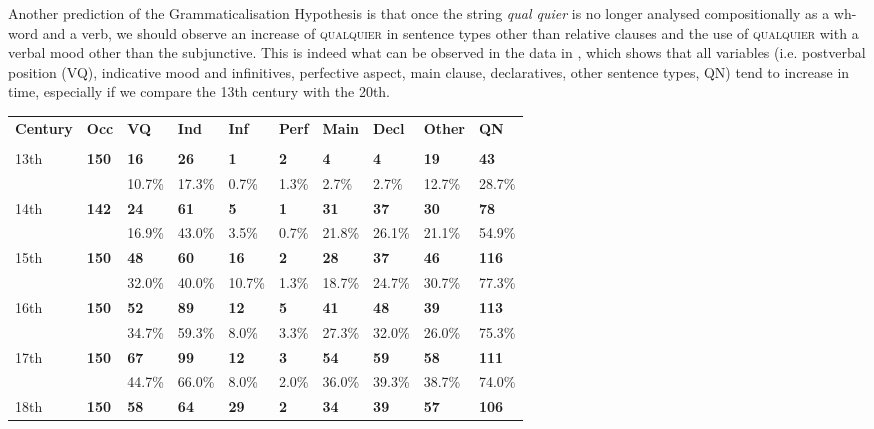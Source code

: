  Another prediction of the Grammaticalisation Hypothesis is that once the string \textit{qual quier} is no longer analysed compositionally as a wh-word and a verb, we should observe an increase of \textsc{qualquier} in sentence types other than relative clauses and the use of \textsc{qualquier} with a verbal mood other than the subjunctive. This is indeed what can be observed in the data in , which shows that all variables (i.e. postverbal position (VQ), indicative mood and infinitives, perfective aspect, main clause, declaratives, other sentence types, QN) tend to increase in time, especially if we compare the 13th century with the 20th.


\begin{table}
\begin{tabularx}{\textwidth}{XXXXXXXXXX}
\lsptoprule
 \textbf{Century} & \textbf{Occ} & \textbf{VQ} & \textbf{Ind} & \textbf{Inf} & \textbf{Perf} & \textbf{Main} & \textbf{Decl} & \textbf{Other} & \textbf{QN}\\
&  &  &  &  &  &  &  &  & \\
 13th & \textbf{150} & \textbf{16} & \textbf{26} & \textbf{1} & \textbf{2} & \textbf{4} & \textbf{4} & \textbf{19} & \textbf{43}\\
& ~ & 10.7\% & 17.3\% & 0.7\% & 1.3\% & 2.7\% & 2.7\% & 12.7\% & 28.7\%\\
 14th & \textbf{142} & \textbf{24} & \textbf{61} & \textbf{5} & \textbf{1} & \textbf{31} & \textbf{37} & \textbf{30} & \textbf{78}\\
& ~ & 16.9\% & 43.0\% & 3.5\% & 0.7\% & 21.8\% & 26.1\% & 21.1\% & 54.9\%\\
 15th & \textbf{150} & \textbf{48} & \textbf{60} & \textbf{16} & \textbf{2} & \textbf{28} & \textbf{37} & \textbf{46} & \textbf{116}\\
& ~ & 32.0\% & 40.0\% & 10.7\% & 1.3\% & 18.7\% & 24.7\% & 30.7\% & 77.3\%\\
 16th & \textbf{150} & \textbf{52} & \textbf{89} & \textbf{12} & \textbf{5} & \textbf{41} & \textbf{48} & \textbf{39} & \textbf{113}\\
& ~ & 34.7\% & 59.3\% & 8.0\% & 3.3\% & 27.3\% & 32.0\% & 26.0\% & 75.3\%\\
 17th & \textbf{150} & \textbf{67} & \textbf{99} & \textbf{12} & \textbf{3} & \textbf{54} & \textbf{59} & \textbf{58} & \textbf{111}\\
& ~ & 44.7\% & 66.0\% & 8.0\% & 2.0\% & 36.0\% & 39.3\% & 38.7\% & 74.0\%\\
 18th & \textbf{150} & \textbf{58} & \textbf{64} & \textbf{29} & \textbf{2} & \textbf{34} & \textbf{39} & \textbf{57} & \textbf{106}\\

\end{tabularx}
\end{table}
